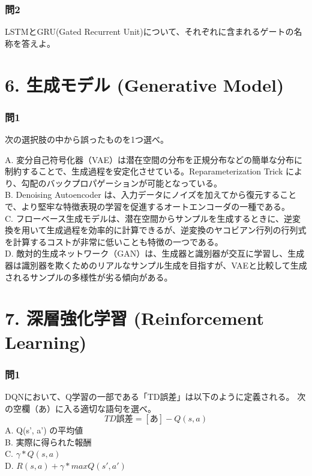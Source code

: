 \documentclass[
  letterpaper,
  DIV=11,
  numbers=noendperiod]{scrreprt}
\begin{document}
\subsection{問2}\label{ux554f2-4}

LSTMとGRU(Gated Recurrent
Unit)について、それぞれに含まれるゲートの名称を答えよ。

\chapter{6. 生成モデル (Generative
Model)}\label{ux751fux6210ux30e2ux30c7ux30eb-generative-model}

\subsection{問1}\label{ux554f1-7}

次の選択肢の中から誤ったものを1つ選べ。

A.
変分自己符号化器（VAE）は潜在空間の分布を正規分布などの簡単な分布に制約することで、生成過程を安定化させている。Reparameterization
Trick により、勾配のバックプロパゲーションが可能となっている。\\
B. Denoising Autoencoder
は、入力データにノイズを加えてから復元することで、より堅牢な特徴表現の学習を促進するオートエンコーダの一種である。\\
C.
フローベース生成モデルは、潜在空間からサンプルを生成するときに、逆変換を用いて生成過程を効率的に計算できるが、逆変換のヤコビアン行列の行列式を計算するコストが非常に低いことも特徴の一つである。\\
D.
敵対的生成ネットワーク（GAN）は、生成器と識別器が交互に学習し、生成器は識別器を欺くためのリアルなサンプル生成を目指すが、VAEと比較して生成されるサンプルの多様性が劣る傾向がある。

\chapter{7. 深層強化学習 (Reinforcement
Learning)}\label{ux6df1ux5c64ux5f37ux5316ux5b66ux7fd2-reinforcement-learning}

\subsection{問1}\label{ux554f1-8}

DQNにおいて、Q学習の一部である「TD誤差」は以下のように定義される。
次の空欄（あ）に入る適切な語句を選べ。 \[
TD誤差 = [あ] − Q(s, a)
\] A. Q(s', a') の平均値\\
B. 実際に得られた報酬\\
C. \({γ * Q(s, a)}\)\\
D. \({R(s, a) + γ * maxQ(s', a')}\)
\end{document}

